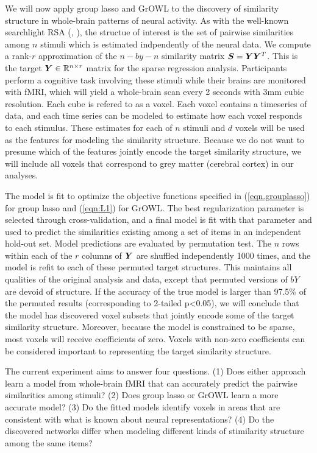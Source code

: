 We will now apply group lasso and GrOWL to the discovery of similarity structure in
whole-brain patterns of neural activity. As with the well-known searchlight RSA (\cite{RSA},
\cite{similarity}), the structue of interest is the set of pairwise similarities among $n$ 
stimuli which is estimated indpendently of the neural data. We compute a rank-$r$
approximation of the $n-by-n$ similarity matrix $\boldsymbol{S} = \boldsymbol{Y} \boldsymbol{Y}^T$. This is the target $\boldsymbol{Y}
\in {\mathbb R}^{n \times r} $ matrix for the sparse regression analysis. Participants
perform a cognitive task involving these stimuli while their brains are monitored with
fMRI, which will yield a whole-brain scan every 2 seconds with 3mm cubic resolution. Each
cube is refered to as a voxel. Each voxel contains a timeseries of data, and each time
series can be modeled to estimate how each voxel responds to each stimulus. These estimates
for each of $n$ stimuli and $d$ voxels will be used as the features for modeling the
similarity structure. Because we do not want to presume which of the features jointly
encode the target similarity structure, we will include all voxels that correspond to grey
matter (cerebral cortex) in our analyses.

The model is fit to optimize the objective functions specified in (\ref{eqn.grouplasso})
for group lasso and (\ref{eqn:L1}) for GrOWL. The best regularization parameter is
selected through cross-validation, and a final model is fit with that parameter and used
to predict the similarities existing among a set of items in an independent hold-out set.
Model predictions are evaluated by permutation test. The $n$ rows within each of the $r$
columns of $\boldsymbol{Y}$ are shuffled independently 1000 times, and the model is refit to each of
these permuted target structures. This maintains all qualities of the original analysis
and data, except that permuted versions of $bY$ are devoid of structure. If the accuracy
of the true model is larger than 97.5\% of the permuted results (corresponding to
2-tailed p<0.05), we will conclude that the model has discovered voxel subsets that
jointly encode some of the target similarity structure. Moreover, because the model is
constrained to be sparse, most voxels will receive coefficients of zero. Voxels with
non-zero coefficients can be considered important to representing the target similarity
structure.

The current experiment aims to answer four questions. (1) Does either approach learn a
model from whole-brain fMRI that can accurately predict the pairwise similarities among
stimuli? (2) Does group lasso or GrOWL learn a more accurate model? (3) Do the fitted
models identify voxels in areas that are consistent with what is known about neural
representations? (4) Do the discovered networks differ when modeling different kinds of
stimilarity structure among the same items?

